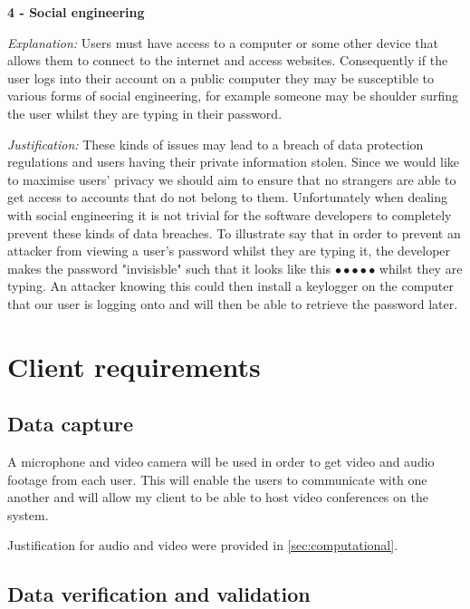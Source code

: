\textsf{\bfseries 4 - Social engineering} \\ \vspace{0.1cm}

\textit{Explanation:}
Users must have access to a computer or some other device that
allows them to connect to the internet and access websites. 
Consequently if the user logs into their account on a public 
computer they may be susceptible to various forms of social 
engineering, for example someone may be shoulder surfing the 
user whilst they are typing in their password. \vspace{0.1cm}

\textit{Justification:}
These kinds of issues may lead to a breach of data protection
regulations and users having their private information stolen.
Since we would like to maximise users' privacy we should aim 
to ensure that no strangers are able to get access to accounts
that do not belong to them. Unfortunately when dealing with 
social engineering it is not trivial for the software 
developers to completely prevent these kinds of data breaches.
To illustrate say that in order to prevent an attacker from 
viewing a user's password whilst they are typing it, the 
developer makes the password "invisisble" such that it looks
like this  $\bullet \bullet \bullet \bullet \bullet$ whilst
they are typing. An attacker knowing this could then install 
a keylogger on the computer that our user is logging onto and
will then be able to retrieve the password later.

\section{Client requirements}


\subsection{Data capture}

A microphone and video camera will be used in order to get 
video and audio footage from each user. This will enable the 
users to communicate with one another and will allow my client
to be able to host video conferences on the system. \\ \vspace{0.2cm}

Justification for audio and video were provided in 
\ref{sec:computational}.

\subsection{Data verification and validation}

